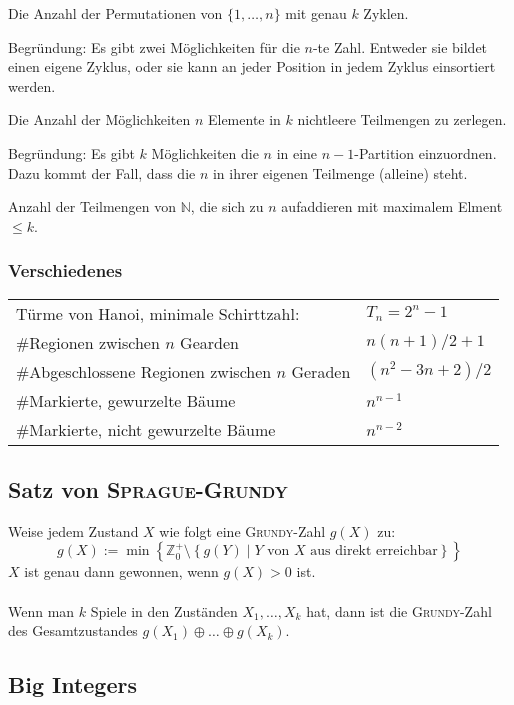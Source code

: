 \begin{bem}\label{bem:stirling1}
	Die Anzahl der Permutationen von $\{1, \ldots, n\}$ mit genau $k$ Zyklen.

	Begründung: Es gibt zwei Möglichkeiten für die $n$-te Zahl. Entweder sie
	bildet einen eigene Zyklus, oder sie kann an jeder Position in jedem Zyklus
	einsortiert werden.
\end{bem}

\begin{bem}\label{bem:stirling2}
	Die Anzahl der Möglichkeiten $n$ Elemente in $k$ nichtleere Teilmengen zu zerlegen.

	Begründung: Es gibt $k$ Möglichkeiten die $n$ in eine $n-1$-Partition
	einzuordnen. Dazu kommt der Fall, dass die $n$ in ihrer eigenen Teilmenge
	(alleine) steht.
\end{bem}

\begin{bem}\label{bem:integerPartitions}
	Anzahl der Teilmengen von $\mathbb{N}$, die sich zu $n$ aufaddieren mit
	maximalem Elment $\leq k$.
\end{bem}

\subsubsection{Verschiedenes}
\begin{tabular}{|l|l|}
	\hline
	Türme von Hanoi, minimale Schirttzahl:					& $T_n = 2^n - 1$ \\
	\#Regionen zwischen $n$ Gearden									& $n\left(n + 1\right) / 2 + 1$ \\
	\#Abgeschlossene Regionen zwischen $n$ Geraden	& $\left(n^2 - 3n + 2\right) / 2$ \\
	\#Markierte, gewurzelte Bäume										& $n^{n-1}$ \\
	\#Markierte, nicht gewurzelte Bäume							& $n^{n-2}$ \\
	\hline
\end{tabular}

\subsection{Satz von \textsc{Sprague-Grundy}}
Weise jedem Zustand $X$ wie folgt eine \textsc{Grundy}-Zahl $g\left(X\right)$ zu:
\[
	g\left(X\right) := \min\left\{
		\mathbb{Z}_0^+ \setminus
		\left\{g\left(Y\right) \mid Y \text{ von } X \text{ aus direkt erreichbar}\right\}
	\right\} 
\]
$X$ ist genau dann gewonnen, wenn $g\left(X\right) > 0$ ist.\\\\
Wenn man $k$ Spiele in den Zuständen $X_1, \ldots, X_k$ hat, dann ist die \textsc{Grundy}-Zahl des Gesamtzustandes $g\left(X_1\right) \oplus \ldots \oplus g\left(X_k\right)$.

\subsection{Big Integers}

